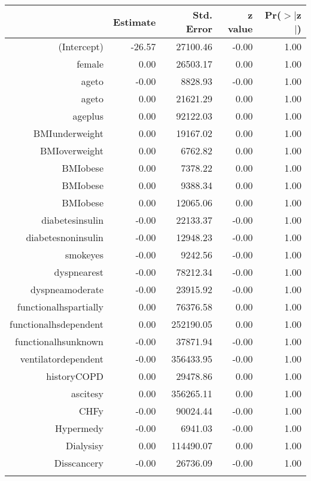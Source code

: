 \bigskip\bigskip
\centering
\begin{tabular}{rrrrr}
  \hline
 & Estimate & Std. Error & z value & Pr($>$$|$z$|$) \\ 
  \hline
(Intercept) & -26.57 & 27100.46 & -0.00 & 1.00 \\ 
  female & 0.00 & 26503.17 & 0.00 & 1.00 \\ 
  age\-65\-to\-74 & -0.00 & 8828.93 & -0.00 & 1.00 \\ 
  age\-75\-to\-84 & 0.00 & 21621.29 & 0.00 & 1.00 \\ 
  age\-85\-plus & 0.00 & 92122.03 & 0.00 & 1.00 \\ 
  BMI\-underweight & 0.00 & 19167.02 & 0.00 & 1.00 \\ 
  BMI\-overweight & 0.00 & 6762.82 & 0.00 & 1.00 \\ 
  BMI\-obese\-1 & 0.00 & 7378.22 & 0.00 & 1.00 \\ 
  BMI\-obese\-2 & 0.00 & 9388.34 & 0.00 & 1.00 \\ 
  BMI\-obese\-3 & 0.00 & 12065.06 & 0.00 & 1.00 \\ 
  diabetes\-insulin & -0.00 & 22133.37 & -0.00 & 1.00 \\ 
  diabetes\-noninsulin & -0.00 & 12948.23 & -0.00 & 1.00 \\ 
  smoke\-yes & -0.00 & 9242.56 & -0.00 & 1.00 \\ 
  dyspnea\-rest & -0.00 & 78212.34 & -0.00 & 1.00 \\ 
  dyspnea\-moderate & -0.00 & 23915.92 & -0.00 & 1.00 \\ 
  functional\-hs\-partially & 0.00 & 76376.58 & 0.00 & 1.00 \\ 
  functional\-hs\-dependent & 0.00 & 252190.05 & 0.00 & 1.00 \\ 
  functional\-hs\-unknown & -0.00 & 37871.94 & -0.00 & 1.00 \\ 
  ventilator\-dependent & -0.00 & 356433.95 & -0.00 & 1.00 \\ 
  history\-COPD & 0.00 & 29478.86 & 0.00 & 1.00 \\ 
  ascites\-y & 0.00 & 356265.11 & 0.00 & 1.00 \\ 
  CHF\-y & -0.00 & 90024.44 & -0.00 & 1.00 \\ 
  Hyper\-med\-y & -0.00 & 6941.03 & -0.00 & 1.00 \\ 
  Dialysis\-y & 0.00 & 114490.07 & 0.00 & 1.00 \\ 
  Diss\-cancer\-y & -0.00 & 26736.09 & -0.00 & 1.00 \\ 
$$
\end{tabular}
